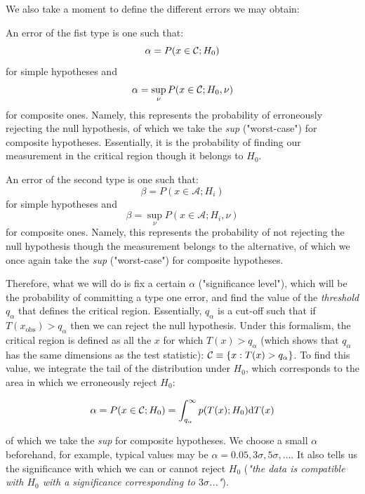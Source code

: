 We also take a moment to define the different errors we may obtain:

\begin{definition}
	An error of the fist type is one such that:
	\[
	\alpha = P(x\in \mathcal{C};H_0)
	\]
	for simple hypotheses and 
	\[
	\alpha =\sup_\nu P(x\in \mathcal{C};H_0,\nu)
	\]
	for composite ones. 
	Namely, this represents the probability of erroneously rejecting the null hypothesis, of which we take the \emph{sup} ("worst-case") for composite hypotheses. Essentially, it is the probability of finding our measurement in the critical region though it belongs to $H_0$.
\end{definition}

\begin{definition}
	An error of the second type is one such that:
	\[
	\beta = P(x\in \mathcal{A};H_i)
	\]
	for simple hypotheses and 
	\[
	\beta =\sup_\nu P(x\in \mathcal{A};H_i,\nu)
	\]
	for composite ones. 
	Namely, this represents the probability of not rejecting the null hypothesis though the measurement belongs to the alternative, of which we once again take the \emph{sup} ("worst-case") for composite hypotheses. 
\end{definition}

Therefore, what we will do is fix a certain $\alpha$ ("significance level"), which will be the probability of committing a type one error, and find the value of the \emph{threshold} $q_\alpha$ that defines the critical region. Essentially, $q_\alpha$ is a cut-off such that if $T(x_{\text{obs}})>q_\alpha$ then we can reject the null hypothesis. Under this formalism, the critical region is defined as all the $x$ for which $T(x)>q_\alpha$ (which shows that $q_\alpha$ has the same dimensions as the test statistic): $\mathcal{C}\equiv\{x:T(x)>q_\alpha\}$. To find this value, we integrate the tail of the distribution under $H_0$, which corresponds to the area in which we erroneously reject $H_0$:
	
	\[
	\alpha = P(x\in \mathcal{C};H_0) = \int_{q_\alpha}^{\infty}p(T(x);H_0)\mathrm{d} T(x)
	\]

of which we take the \emph{sup} for composite hypotheses. We choose a small $\alpha$ beforehand, for example, typical values may be $\alpha = 0.05, 3\sigma, 5\sigma,\dots$. It also tells us the significance with which we can or cannot reject $H_0$ (\emph{"the data is compatible with $H_0$ with a significance corresponding to $3\sigma$..."}).


